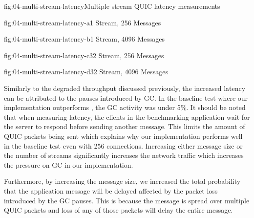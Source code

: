 
\begin{myFigure}{fig:04-multi-stream-latency}{Multiple stream QUIC latency measurements}
\begin{mySubfigure}{0.49\linewidth}{fig:04-multi-stream-latency-a}{1 Stream, \SI{256}{\byte} Messages}
\footnotesize

\end{mySubfigure}
\begin{mySubfigure}{0.49\linewidth}{fig:04-multi-stream-latency-b}{1 Stream, \SI{4096}{\byte} Messages}
\footnotesize

\end{mySubfigure}

\begin{mySubfigure}{0.49\linewidth}{fig:04-multi-stream-latency-c}{32 Stream, \SI{256}{\byte} Messages}
\footnotesize

\end{mySubfigure}
\begin{mySubfigure}{0.49\linewidth}{fig:04-multi-stream-latency-d}{32 Stream, \SI{4096}{\byte} Messages}
\footnotesize

\end{mySubfigure}
\end{myFigure}

Similarly to the degraded throughput discussed previously, the increased latency can be attributed
to the pauses introduced by GC\@. In the baseline test where our implementation outperforms
\libmsquic{}, the GC activity was under 5\%. It should be noted that when measuring latency, the
clients in the benchmarking application wait for the server to respond before sending another
message. This limits the amount of QUIC packets being sent which explains why our implementation
performs well in the baseline test even with 256 connections. Increasing either message size or the
number of streams significantly increases the network traffic which increases the pressure on GC in
our implementation.

Furthermore, by increasing the message size, we increased the total probability that the application
message will be delayed affected by the packet loss introduced by the GC pauses. This is because the
message is spread over multiple QUIC packets and loss of any of those packets will delay the entire
message.

